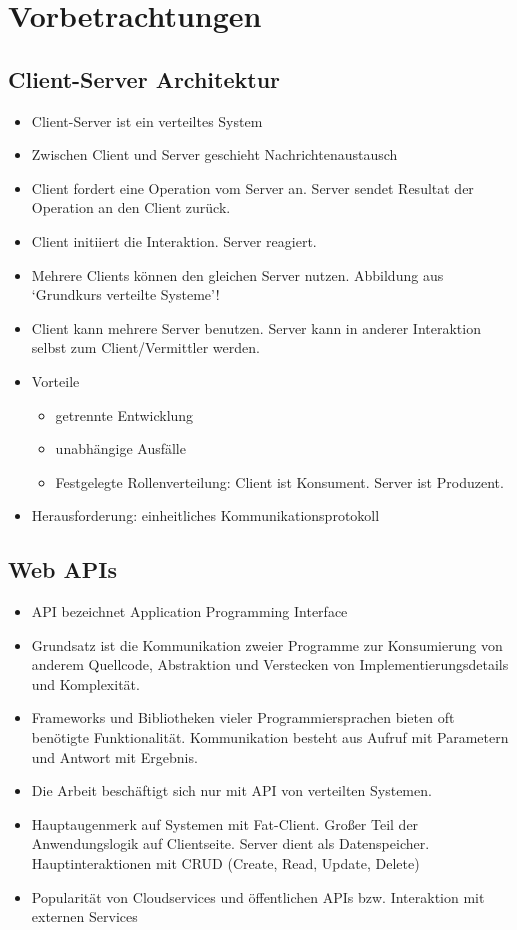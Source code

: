 \section{Vorbetrachtungen}
\subsection{Client-Server Architektur}
\begin{itemize}
  \item Client-Server ist ein verteiltes System
  \item Zwischen Client und Server geschieht Nachrichtenaustausch
  \item Client fordert eine Operation vom Server an. Server sendet Resultat der Operation an den Client zurück.
  \item Client initiiert die Interaktion. Server reagiert.
  \item Mehrere Clients können den gleichen Server nutzen. Abbildung aus `Grundkurs verteilte Systeme'!
  \item Client kann mehrere Server benutzen. Server kann in anderer Interaktion selbst zum Client/Vermittler werden.
  \item Vorteile
    \begin{itemize}
      \item getrennte Entwicklung
      \item unabhängige Ausfälle
      \item Festgelegte Rollenverteilung: Client ist Konsument. Server ist Produzent.
    \end{itemize}
  \item Herausforderung: einheitliches Kommunikationsprotokoll
\end{itemize}

\subsection{Web APIs}
\begin{itemize}
  \item API bezeichnet Application Programming Interface
  \item Grundsatz ist die Kommunikation zweier Programme zur Konsumierung von anderem Quellcode, Abstraktion und Verstecken von Implementierungsdetails und Komplexität.
  \item Frameworks und Bibliotheken vieler Programmiersprachen bieten oft benötigte Funktionalität. Kommunikation besteht aus Aufruf mit Parametern und Antwort mit Ergebnis.
  \item Die Arbeit beschäftigt sich nur mit API von verteilten Systemen.
  \item Hauptaugenmerk auf Systemen mit Fat-Client. Großer Teil der Anwendungslogik auf Clientseite. Server dient als Datenspeicher. Hauptinteraktionen mit CRUD (Create, Read, Update, Delete)
  \item Popularität von Cloudservices und öffentlichen APIs bzw. Interaktion mit externen Services
\end{itemize}

